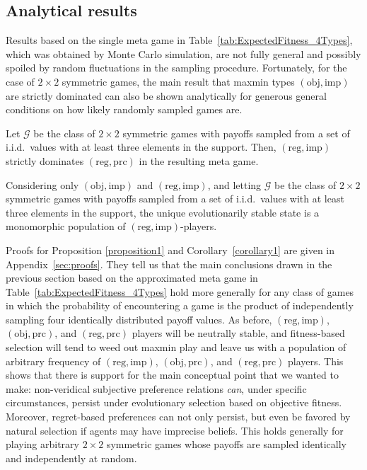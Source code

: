 \documentclass[fleqn,reqno,11pt]{article}
\begin{document}
\subsection{Analytical results}
\label{sec:analytical-results}

Results based on the single meta game in Table~\ref{tab:ExpectedFitness_4Types}, which was
obtained by Monte Carlo simulation, are not fully general and possibly spoiled by random
fluctuations in the sampling procedure. Fortunately, for the case of $2 \times 2$ symmetric
games, the main result that maxmin types $(\text{obj}, \text{imp})$ are strictly dominated can
also be shown analytically for generous general conditions on how likely randomly sampled games
are. 

\begin{proposition} \label{proposition1}
  Let $\mathcal{G}$ be the class of $2 \times 2$ symmetric games with payoffs sampled from a
  set of i.i.d.~values with at least three elements in the support. Then,
  $(\text{reg}, \text{imp})$ strictly dominates $(\text{reg}, \text{prc})$ in the resulting
  meta game.
\end{proposition}

\begin{corollary} \label{corollary1} Considering only $(\text{obj}, \text{imp})$ and
  $(\text{reg}, \text{imp})$, and letting $\mathcal{G}$ be the class of $2 \times 2$ symmetric
  games with payoffs sampled from a set of i.i.d.~values with at least three elements in the
  support, the unique evolutionarily stable state is a monomorphic population of
  $(\text{reg}, \text{imp})$-players.
\end{corollary}

Proofs for Proposition \ref{proposition1} and Corollary~\ref{corollary1} are given in
Appendix~\ref{sec:proofs}. They tell us that the main conclusions drawn in the previous section
based on the approximated meta game in Table~\ref{tab:ExpectedFitness_4Types} hold more
generally for any class of games in which the probability of encountering a game is the product
of independently sampling four identically distributed payoff values. As before,
$(\text{reg}, \text{imp})$, $(\text{obj}, \text{prc})$, and $(\text{reg}, \text{prc})$ players
will be neutrally stable, and fitness-based selection will tend to weed out maxmin play and
leave us with a population of arbitrary frequency of $(\text{reg}, \text{imp})$,
$(\text{obj}, \text{prc})$, and $(\text{reg}, \text{prc})$ players. This shows that there is
support for the main conceptual point that we wanted to make: non-veridical subjective
preference relations \emph{can}, under specific circumstances, persist under evolutionary
selection based on objective fitness. Moreover, regret-based preferences can not only persist,
but even be favored by natural selection if agents may have imprecise beliefs. This holds
generally for playing arbitrary $2 \times 2$ symmetric games whose payoffs are sampled
identically and independently at random.
\end{document}
